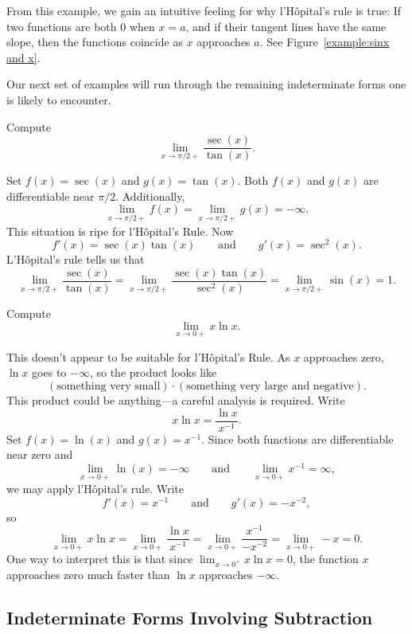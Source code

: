 \documentclass{ximera}
\begin{document}
From this example, we gain an intuitive feeling for why l'H\^opital's
rule is true: If two functions are both $0$ when $x=a$, and if their
tangent lines have the same slope, then the functions coincide as $x$
approaches $a$. See Figure~\ref{example:sinx and x}. 




Our next set of examples will run through the remaining indeterminate
forms one is likely to encounter.

\begin{example}[$\pmb\infty$/$\pmb\infty$] Compute 
\[
\lim_{x\to \pi/2+} \frac{\sec(x)}{\tan(x)}.
\]

Set $f(x) = \sec(x)$ and $g(x) = \tan(x)$. Both $f(x)$ and $g(x)$
are differentiable near $\pi/2$. Additionally,
\[
\lim_{x \to \pi/2+} f(x) = \lim_{x \to \pi/2+}g(x) = -\infty.
\]
This situation is ripe for l'H\^opital's Rule. Now 
\[
f'(x) = \sec(x)\tan(x) \qquad\text{and}\qquad g'(x) = \sec^2(x).
\]
L'H\^opital's rule tells us that 
\[
\lim_{x\to \pi/2+} \frac{\sec(x)}{\tan(x)} = \lim_{x\to \pi/2+}
\frac{\sec(x)\tan(x)}{\sec^2(x)} = \lim_{x\to \pi/2+} \sin(x) =
1.
\]
\end{example}



\begin{example}\label{example:xlnx infty} 
Compute 
\[
\lim_{x\to 0+} x\ln x.
\]

This doesn't appear to be suitable for l'H\^opital's Rule. As $x$
approaches zero, $\ln x$ goes to $-\infty$, so the product looks like
\[
(\text{something very small})\cdot (\text{something very large and
  negative}).
\] 
This product could be anything---a careful analysis is required.
Write
\[
x\ln x = \frac{\ln x}{x^{-1}}.
\]
Set $f(x) = \ln(x)$ and $g(x) = x^{-1}$.  Since both functions are differentiable near zero and 
\[
\lim_{x\to 0+} \ln(x) = -\infty\qquad\text{and}\qquad \lim_{x\to 0+} x^{-1} = \infty,
\]
we may apply l'H\^opital's rule. Write
\[
f'(x) = x^{-1}\qquad \text{and}\qquad g'(x) = -x^{-2},
\]
so
\[
\lim_{x\to 0+} x\ln x = \lim_{x\to 0+} \frac{\ln x}{x^{-1}} = \lim_{x\to 0+} \frac{x^{-1}}{-x^{-2}} =\lim_{x\to 0+} -x = 0.
\]
One way to interpret this is that since $\lim_{x\to 0^+}x\ln x = 0$,
the function $x$ approaches zero much faster than $\ln x$ approaches
$-\infty$.
\end{example}

\subsection*{Indeterminate Forms Involving Subtraction}
\end{document}

